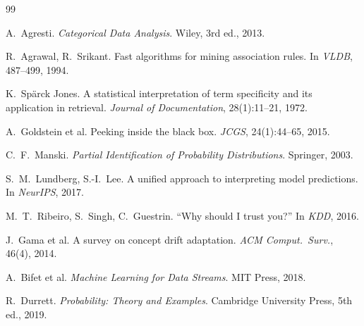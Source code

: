 \documentclass[11pt]{article}
\begin{document}
\begin{thebibliography}{99}

A.~Agresti.
\newblock \emph{Categorical Data Analysis}.
\newblock Wiley, 3rd ed., 2013.

R.~Agrawal, R.~Srikant.
\newblock Fast algorithms for mining association rules.
\newblock In \emph{VLDB}, 487--499, 1994.

K.~Sp\"{a}rck Jones.
\newblock A statistical interpretation of term specificity and its application in retrieval.
\newblock \emph{Journal of Documentation}, 28(1):11--21, 1972.

A.~Goldstein et al.
\newblock Peeking inside the black box.
\newblock \emph{JCGS}, 24(1):44--65, 2015.

C.~F.~Manski.
\newblock \emph{Partial Identification of Probability Distributions}.
\newblock Springer, 2003.

S.~M.~Lundberg, S.-I.~Lee.
\newblock A unified approach to interpreting model predictions.
\newblock In \emph{NeurIPS}, 2017.

M.~T.~Ribeiro, S.~Singh, C.~Guestrin.
\newblock ``Why should I trust you?''
\newblock In \emph{KDD}, 2016.

J.~Gama et al.
\newblock A survey on concept drift adaptation.
\newblock \emph{ACM Comput.\ Surv.}, 46(4), 2014.

A.~Bifet et al.
\newblock \emph{Machine Learning for Data Streams}.
\newblock MIT Press, 2018.

R.~Durrett.
\newblock \emph{Probability: Theory and Examples}.
\newblock Cambridge University Press, 5th ed., 2019.

\end{thebibliography}
\end{document}
